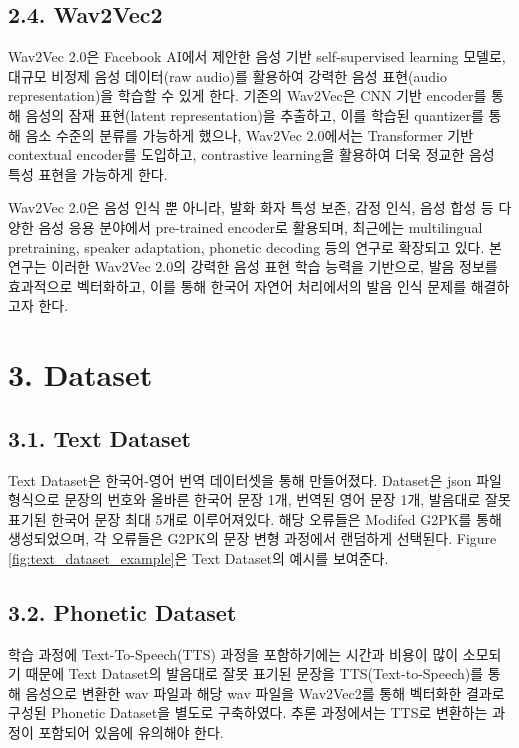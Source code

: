 \documentclass[letterpaper]{article} %
\begin{document}
\subsection{2.4. Wav2Vec2}
Wav2Vec 2.0은 Facebook AI에서 제안한 음성 기반 self-supervised learning 모델로, 대규모 비정제 음성 데이터(raw audio)를 활용하여 강력한 음성 표현(audio representation)을 학습할 수 있게 한다. 기존의 Wav2Vec은 CNN 기반 encoder를 통해 음성의 잠재 표현(latent representation)을 추출하고, 이를 학습된 quantizer를 통해 음소 수준의 분류를 가능하게 했으나, Wav2Vec 2.0에서는 Transformer 기반 contextual encoder를 도입하고, contrastive learning을 활용하여 더욱 정교한 음성 특성 표현을 가능하게 한다.

Wav2Vec 2.0은 음성 인식 뿐 아니라, 발화 화자 특성 보존, 감정 인식, 음성 합성 등 다양한 음성 응용 분야에서 pre-trained encoder로 활용되며, 최근에는 multilingual pretraining, speaker adaptation, phonetic decoding 등의 연구로 확장되고 있다. 본 연구는 이러한 Wav2Vec 2.0의 강력한 음성 표현 학습 능력을 기반으로, 발음 정보를 효과적으로 벡터화하고, 이를 통해 한국어 자연어 처리에서의 발음 인식 문제를 해결하고자 한다.

\section{3. Dataset}

\subsection{3.1. Text Dataset}
Text Dataset은 한국어-영어 번역 데이터셋\cite{aihub_korean_english_parallel}을 통해 만들어졌다. Dataset은 json 파일 형식으로 문장의 번호와 올바른 한국어 문장 1개, 번역된 영어 문장 1개, 발음대로 잘못 표기된 한국어 문장 최대 5개로 이루어져있다. 해당 오류들은 Modifed G2PK를 통해 생성되었으며, 각 오류들은 G2PK의 문장 변형 과정에서 랜덤하게 선택된다. Figure \ref{fig:text_dataset_example}은 Text Dataset의 예시를 보여준다.


\subsection{3.2. Phonetic Dataset}
학습 과정에 Text-To-Speech(TTS) 과정을 포함하기에는 시간과 비용이 많이 소모되기 때문에 Text Dataset의 발음대로 잘못 표기된 문장을 TTS(Text-to-Speech)를 통해 음성으로 변환한 wav 파일과 해당 wav 파일을 Wav2Vec2를 통해 벡터화한 결과로 구성된 Phonetic Dataset을 별도로 구축하였다. 추론 과정에서는 TTS로 변환하는 과정이 포함되어 있음에 유의해야 한다.
\end{document}
